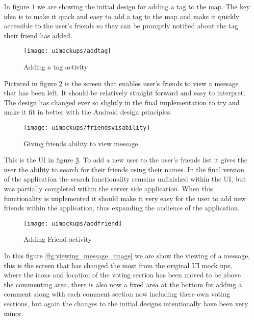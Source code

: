 \noindent
In figure \ref{fig:add_tag_activity_image} we are showing the initial design for adding a tag to the map. The key idea is to make it quick and easy to add a tag to the map and make it quickly accessible to the user's friends so they can be promptly notified about the tag their friend has added.\\

\begin{figure}[H]
    \centering
    \texttt{[image: uimockups/addtag]}
    \caption{Adding a tag activity}
    \label{fig:add_tag_activity_image}
\end{figure}

\noindent
Pictured in figure \ref{fig:giving_friends_visability_image} is the screen that enables user's friends to view a message that has been left. It should be relatively straight forward and easy to interpret. The design has changed ever so slightly in the final implementation to try and make it fit in better with the Android design principles.\\

\begin{figure}[H]
    \centering
    \texttt{[image: uimockups/friendsvisability]}
    \caption{Giving friends ability to view message}
    \label{fig:giving_friends_visability_image}
\end{figure} 

\noindent
This is the UI in figure \ref{fig:add_friend_activity_image}. To add a new user to the user's friends list it gives the user the ability to search for their friends using their names. In the final version of the application the search functionality remains unfinished within the UI, but was partially completed within the server side application. When this functionality is implemented it should make it very easy for the user to add new friends within the application, thus expanding the audience of the application.\\


\begin{figure}[H]
    \centering
    \texttt{[image: uimockups/addfriend]}
    \caption{Adding Friend activity}
    \label{fig:add_friend_activity_image}
\end{figure} 

\noindent
In this figure \ref{fig:viewing_message_image} we are show the viewing of a message, this is the screen that has changed the most from the original UI mock ups, where the icons and location of the voting section has been moved to be above the commenting area, there is also now a fixed area at the bottom for adding a comment along with each comment section now including there own voting sections, but again the changes to the initial designs intentionally have been very minor.\\

